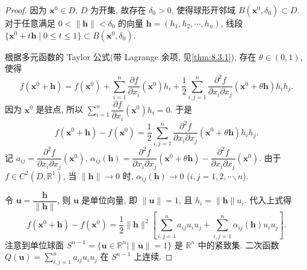 \begin{proof}
因为 $\boldsymbol{x}^{0} \in D$, $D$ 为开集, 故存在 $\delta_{0} > 0$, 使得球形开邻域 $B(\boldsymbol{x}^{0}, \delta_{0}) \subset D$. 对于任意满足 $0 < \|\boldsymbol{h}\| < \delta_{0}$ 的向量 $\boldsymbol{h} = (h_{1}, h_{2}, \cdots, h_{n})$, 线段 $\{\boldsymbol{x}^{0} + t\boldsymbol{h} \mid 0 \leqslant t \leqslant 1\} \subset B(\boldsymbol{x}^{0}, \delta_{0})$.

根据多元函数的 Taylor 公式(带 Lagrange 余项, 见\cref{thm:8.3.1}), 存在 $\theta \in (0, 1)$, 使得
\[
  f(\boldsymbol{x}^{0} + \boldsymbol{h}) = f(\boldsymbol{x}^{0}) + \sum_{i=1}^{n}\frac{\partial f}{\partial x_{i}}(\boldsymbol{x}^{0}) h_{i} + \frac{1}{2}\sum_{i,j=1}^{n}\frac{\partial^{2}f}{\partial x_{i}\partial x_{j}}(\boldsymbol{x}^{0} + \theta\boldsymbol{h}) h_{i} h_{j}.
\]
因为 $\boldsymbol{x}^{0}$ 是驻点, 所以 $\sum_{i=1}^{n}\dfrac{\partial f}{\partial x_{i}}(\boldsymbol{x}^{0}) h_{i} = 0$. 于是
\[
  f(\boldsymbol{x}^{0} + \boldsymbol{h}) - f(\boldsymbol{x}^{0}) = \frac{1}{2}\sum_{i,j=1}^{n}\frac{\partial^{2}f}{\partial x_{i}\partial x_{j}}(\boldsymbol{x}^{0} + \theta\boldsymbol{h}) h_{i} h_{j}.
\]
记 $a_{ij} = \dfrac{\partial^{2}f}{\partial x_{i}\partial x_{j}}(\boldsymbol{x}^{0})$, $\alpha_{ij}(\boldsymbol{h}) = \dfrac{\partial^{2}f}{\partial x_{i}\partial x_{j}}(\boldsymbol{x}^{0} + \theta\boldsymbol{h}) - \dfrac{\partial^{2}f}{\partial x_{i}\partial x_{j}}(\boldsymbol{x}^{0})$. 由于 $f \in C^{2}(D, \mathbb{R}^{1})$, 当 $\|\boldsymbol{h}\| \to 0$ 时, $\alpha_{ij}(\boldsymbol{h}) \to 0$ ($i, j = 1, 2, \cdots, n$).

令 $\boldsymbol{u} = \dfrac{\boldsymbol{h}}{\|\boldsymbol{h}\|}$, 则 $\boldsymbol{u}$ 是单位向量, 即 $\|\boldsymbol{u}\| = 1$, 且 $h_{i} = \|\boldsymbol{h}\| u_{i}$. 代入上式得
\[
  f(\boldsymbol{x}^{0} + \boldsymbol{h}) - f(\boldsymbol{x}^{0}) = \frac{1}{2} \|\boldsymbol{h}\|^{2} \left[ \sum_{i,j=1}^{n} a_{ij} u_{i} u_{j} + \sum_{i,j=1}^{n} \alpha_{ij}(\boldsymbol{h}) u_{i} u_{j} \right].
\]
注意到单位球面 $S^{n-1} = \{\boldsymbol{u} \in \mathbb{R}^{n} \mid \|\boldsymbol{u}\| = 1\}$ 是 $\mathbb{R}^{n}$ 中的紧致集. 二次函数 $Q(\boldsymbol{u}) = \sum_{i,j=1}^{n} a_{ij} u_{i} u_{j}$ 在 $S^{n-1}$ 上连续.


\end{proof}
